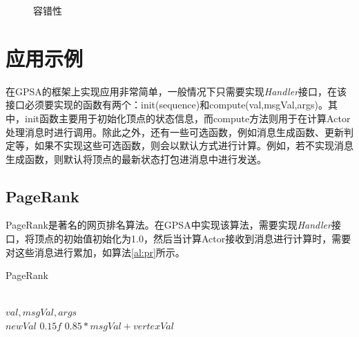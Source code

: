 \begin{figure}[htbp]
  \centering
  \caption{容错性}\label{fig:ft}
\vspace{\baselineskip}
\end{figure}




\section{应用示例}
在GPSA的框架上实现应用非常简单，一般情况下只需要实现\textit{Handler}接口，在该接口必须要实现的函数有两个：\textnormal{init(sequence)}和\textnormal{compute(val,msgVal,args)}。其中，\textnormal{init}函数主要用于初始化顶点的状态信息，而compute方法则用于在计算Actor处理消息时进行调用。除此之外，还有一些可选函数，例如消息生成函数、更新判定等，如果不实现这些可选函数，则会以默认方式进行计算。例如，若不实现消息生成函数，则默认将顶点的最新状态打包进消息中进行发送。

\subsection{PageRank}
PageRank是著名的网页排名算法。在GPSA中实现该算法，需要实现\textit{Handler}接口，将顶点的初始值初始化为1.0，然后当计算Actor接收到消息进行计算时，需要对这些消息进行累加，如算法\ref{al:pr}所示。
\begin{algorithm}
{
{
\renewcommand\baselinestretch{1.5}\selectfont %

\caption{PageRank}
\label{al:pr}
\begin{algorithmic}[1]
\REQUIRE ~\\
	$val,msgVal,args$
\ENSURE ~\\
	$newVal$
	 \RETURN $ 0.15f$
\ENDIF
\RETURN $0.85*msgVal + vertexVal$

\end{algorithmic}
}
\par}
\end{algorithm}

